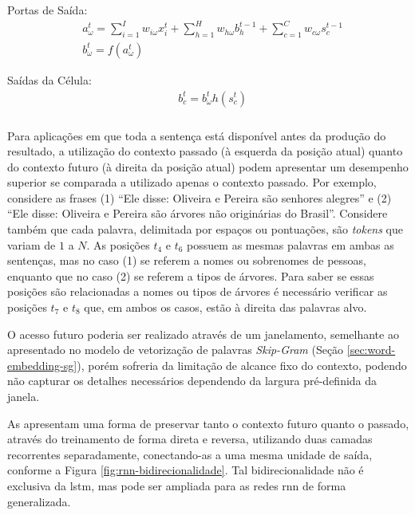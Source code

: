 Portas de Saída:
\begin{equation}
\begin{split}
    \label{eq:lstm-output-gates}
    & a_\omega^t = \sum_{i=1}^{I} w_{i\omega} x_i^t
                   + \sum_{h=1}^{H} w_{h\omega} b_h^{t-1}
                   + \sum_{c=1}^{C} w_{c\omega} s_c^{t-1} \\
    & b_\omega^t = f(a_\omega^t)
\end{split}
\end{equation}

Saídas da Célula:
\begin{equation}
\begin{split}
    \label{eq:lstm-output}
    & b_c^t = b_\omega^t h(s_c^t)
\end{split}
\end{equation}

\subsubsection{}
\label{sec:bilstm}

Para aplicações em que toda a sentença está disponível antes da produção do resultado, a utilização do contexto passado (à esquerda da posição atual) quanto do contexto futuro (à direita da posição atual) podem apresentar um desempenho superior se comparada a utilizado apenas o contexto passado. Por exemplo, considere as frases (1) \enquote{Ele disse: Oliveira e Pereira são senhores alegres} e (2) \enquote{Ele disse: Oliveira e Pereira são árvores não originárias do Brasil}. Considere também que cada palavra, delimitada por espaços ou pontuações, são \textit{tokens} que variam de $1$ a $N$. As posições $t_4$ e $t_6$ possuem as mesmas palavras em ambas as sentenças, mas no caso (1) se referem a nomes ou sobrenomes de pessoas, enquanto que no caso (2) se referem a tipos de árvores. Para saber se essas posições são relacionadas a nomes ou tipos de árvores é necessário verificar as posições $t_7$ e $t_8$ que, em ambos os casos, estão à direita das palavras alvo.

O acesso futuro poderia ser realizado através de um janelamento, semelhante ao apresentado no modelo de vetorização de palavras \textit{Skip-Gram} (Seção \ref{sec:word-embedding-sg}), porém sofreria da limitação de alcance fixo do contexto, podendo não capturar os detalhes necessários dependendo da largura pré-definida da janela.

As  apresentam uma forma de preservar tanto o contexto futuro quanto o passado, através do treinamento de forma direta e reversa, utilizando duas camadas recorrentes separadamente, conectando-as a uma mesma unidade de saída, conforme a Figura \ref{fig:rnn-bidirecionalidade}. Tal bidirecionalidade não é exclusiva da \gls{lstm}, mas pode ser ampliada para as redes \gls{rnn} de forma generalizada. \cite{Graves2012Supervised}

